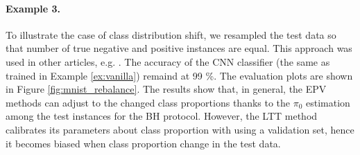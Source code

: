 \documentclass{article}
\begin{document}
\paragraph{Example 3.} To illustrate the case of class distribution shift, we resampled the test data so that number of true negative and positive instances are equal. This approach was used in other articles, e.g.  \cite{joseph_d__viviano__2019}. The accuracy of the CNN classifier (the same as trained in Example \ref{ex:vanilla}) remaind at 99 \%. The evaluation plots are shown in Figure \ref{fig:mnist_rebalance}. The results show that, in general, the EPV methods can adjust to the changed class proportions thanks to the $\pi_0$ estimation among the test instances for the BH protocol. However, the LTT method calibrates its parameters about class proportion with using a validation set, hence it becomes biased when class proportion change in the test data. 
\end{document}

